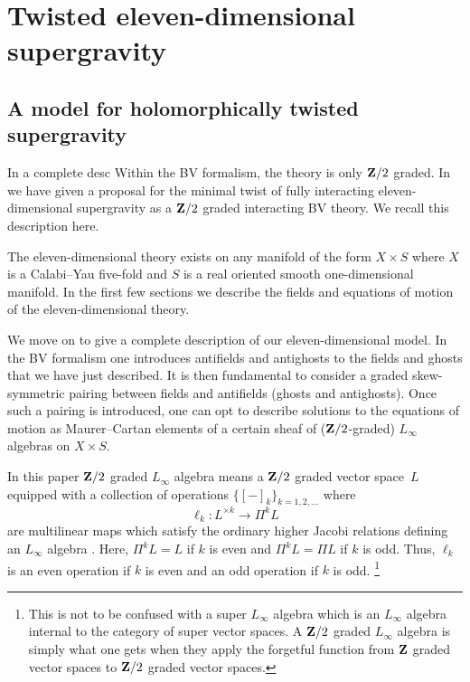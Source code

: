 


\section{Twisted eleven-dimensional supergravity}
%
\subsection{A model for holomorphically twisted supergravity}

In \cite{SWspinor} a complete desc%
Within the BV formalism, the theory is only $\mathbf{Z}/2$ graded.
In \cite{RSW} we have given a proposal for the minimal twist of fully interacting eleven-dimensional supergravity as a $\mathbf{Z}/2$ graded interacting BV theory.
We recall this description here.

The eleven-dimensional theory exists on any manifold of the form $X \times S$ where $X$ is a Calabi--Yau five-fold and $S$ is a real oriented smooth one-dimensional manifold.
In the first few sections we describe the fields and equations of motion of the eleven-dimensional theory. 

%

\parsec[s:sugrafields]



\parsec[s:Lsugra]

We move on to give a complete description of our eleven-dimensional model.
In the BV formalism one introduces antifields and antighosts to the fields and ghosts that we have just described.
It is then fundamental to consider a graded skew-symmetric pairing between fields and antifields (ghosts and antighosts). 
Once such a pairing is introduced, one can opt to describe solutions to the equations of motion as Maurer--Cartan elements of a certain sheaf of ($\mathbf{Z}/2$-graded) $L_\infty$ algebras on $X \times S$.

In this paper $\mathbf{Z}/2$ graded $L_\infty$ algebra means a $\mathbf{Z}/2$ graded vector space~$L$ equipped with a collection of operations $\{[-]_k\}_{k = 1,2,\ldots}$ where 
\[
\ell_k \colon L^{\times k} \to \Pi^k L 
\]
are multilinear maps which satisfy the ordinary higher Jacobi relations defining an $L_\infty$ algebra \cite{??}. 
Here, $\Pi^k L = L$ if $k$ is even and $\Pi^k L = \Pi L$ if $k$ is odd. 
Thus, $\ell_k$ is an even operation if $k$ is even and an odd operation if $k$ is odd. 
\footnote{This is not to be confused with a super $L_\infty$ algebra which is an $L_\infty$ algebra internal to the category of super vector spaces.
A $\mathbf{Z}/2$ graded $L_\infty$ algebra is simply what one gets when they apply the forgetful function from $\mathbf{Z}$ graded vector spaces to $\mathbf{Z}/2$ graded vector spaces.}

